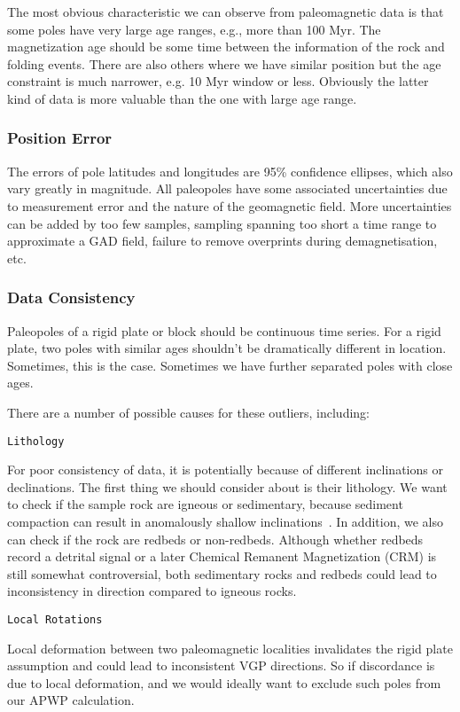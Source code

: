 The most obvious characteristic we can observe from paleomagnetic data is that
some poles have very large age ranges, e.g., more than 100 Myr. The
magnetization age should be some time between the information of the rock and
folding events. There are also others where we have similar position but the age
constraint is much narrower, e.g. 10 Myr window or less. Obviously the latter
kind of data is more valuable than the one with large age range.

\subsubsection{Position Error}

The errors of pole latitudes and longitudes are 95\% confidence ellipses, which
also vary greatly in magnitude. All paleopoles have some associated
uncertainties due to measurement error and the nature of the geomagnetic field.
More uncertainties can be added by too few samples, sampling spanning too short
a time range to approximate a GAD field, failure to remove overprints during
demagnetisation, etc.

\subsubsection{Data Consistency}

Paleopoles of a rigid plate or block should be continuous time series. For a
rigid plate, two poles with similar ages shouldn't be dramatically different in
location. Sometimes, this is the case. Sometimes we have further separated poles
with close ages.

There are a number of possible causes for these outliers, including:

\verb"Lithology"

For poor consistency of data, it is potentially because of different
inclinations or declinations. The first thing we should consider about is their
lithology. We want to check if the sample rock are igneous or sedimentary,
because sediment compaction can result in anomalously shallow
inclinations~\cite{T19}. In addition, we also can check if the rock are redbeds
or non-redbeds. Although whether redbeds record a detrital signal or a later
Chemical Remanent Magnetization (CRM) is still somewhat controversial, both
sedimentary rocks and redbeds could lead to inconsistency in direction compared
to igneous rocks.

\verb"Local Rotations"

Local deformation between two paleomagnetic localities invalidates the rigid
plate assumption and could lead to inconsistent VGP directions. So if
discordance is due to local deformation, and we would ideally want to exclude
such poles from our APWP calculation.

